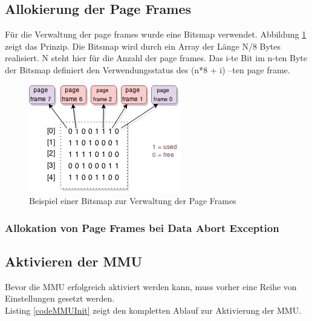 

\subsection{Allokierung der Page Frames}

Für die Verwaltung der page frames wurde eine Bitsmap verwendet. Abbildung \ref{fig:BitsMap} zeigt das Prinzip.
Die Bitsmap wird durch ein Array der Länge N/8 Bytes realisiert. N steht hier für die Anzahl der page frames. Das i-te Bit im n-ten Byte der Bitsmap definiert den Verwendungsstatus des (n*8 + i) –ten page frame.




\begin{figure}[H]
	\centering
	\includegraphics[scale=1]{chapters/mmu/figures/BitsMap}
	\caption{Beispiel einer Bitsmap zur Verwaltung der Page Frames}
	\label{fig:BitsMap}
\end{figure}

\subsubsection{Allokation von Page Frames bei Data Abort Exception}

\subsection{Aktivieren der MMU}
\label{subsect:activateMMU}

Bevor die MMU erfolgreich aktiviert werden kann, muss vorher eine Reihe von Einstellungen gesetzt werden.\\


Listing \ref{codeMMUInit} zeigt den kompletten Ablauf zur Aktivierung der MMU.




